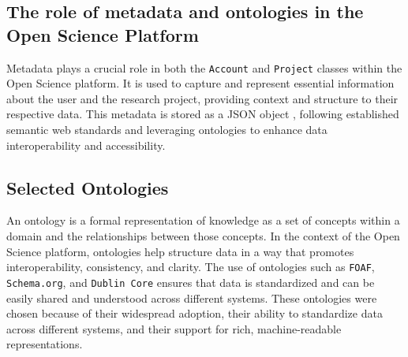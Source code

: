 \documentclass{article}
\begin{document}
\subsection{The role of metadata and ontologies in the Open Science Platform}

Metadata plays a crucial role in both the \texttt{Account} and \texttt{Project} classes within the Open Science platform. It is used to capture and represent essential information about the user and the research project, providing context and structure to their respective data. This metadata is stored as a  JSON object \cite{rfc8259}, following established semantic web standards and leveraging ontologies to enhance data interoperability and accessibility.


\subsection{Selected Ontologies}
An ontology is a formal representation of knowledge as a set of concepts within a domain and the relationships between those concepts. In the context of the Open Science platform, ontologies help structure data in a way that promotes interoperability, consistency, and clarity. The use of ontologies such as \texttt{FOAF}, \texttt{Schema.org}, and \texttt{Dublin Core} ensures that data is standardized and can be easily shared and understood across different systems. These ontologies were chosen because of their widespread adoption, their ability to standardize data across different systems, and their support for rich, machine-readable representations.
\end{document}
